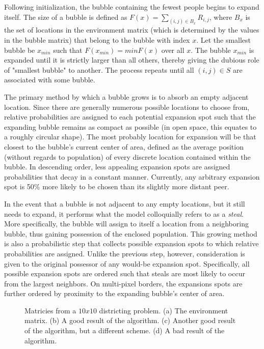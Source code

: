 \documentclass[11pt]{article}				%
\begin{document}
Following initialization, the bubble containing the fewest people begins
to expand itself. The size of a bubble is defined as ${F(x)=\sum_{(i,j)
\in B_x}R_{i,j}}$, where $B_x$ is the set of locations in the environment 
matrix (which is determined by the values in the bubble matrix) that
belong to the bubble with index $x$. Let the smallest bubble be $x_{min}$ 
such that ${F(x_{min})={min} F(x)}$ over all $x$. The bubble $x_{min}$ is 
expanded until it is strictly larger than all others, thereby giving the
dubious role of "smallest bubble" to another. The process repeats until
all $(i,j) \in S$ are associated with some bubble.

The primary method by which a bubble grows is to absorb an empty adjacent 
location. Since there are generally numerous possible locations to choose 
from, relative probabilities are assigned to each potential expansion
spot such that the expanding bubble remains as compact as possible (in
open space, this equates to a roughly circular shape). The most probably
location for expansion will be that closest to the bubble's current
center of area, defined as the average position (without regards to
population) of every discrete location contained within the bubble. In
descending order, less appealing expansion spots are assigned
probabilities that decay in a constant manner. Currently, any arbitrary
expansion spot is 50\% more likely to be chosen than its slightly more
distant peer.

In the event that a bubble is not adjacent to any empty locations, but it 
still needs to expand, it performs what the model colloquially refers to
as a \textit{steal}. More specifically, the bubble will assign to itself
a location from a neighboring bubble, thus gaining possession of the
enclosed population. This growing method is also a probabilistic step
that collects possible expansion spots to which relative probabilities
are assigned. Unlike the previous step, however, consideration is given
to the original possessor of any would-be expansion spot. Specifically,
all possible expansion spots are ordered such that steals are most likely 
to occur from the largest neighbors. On multi-pixel borders, the
expansions spots are further ordered by proximity to the expanding
bubble's center of area.

\begin{figure}
\caption{Matricies from a $10 x 10$ districting problem. (a) The
environment matrix. (b) A good result of the algorithm. (c) Another good
result of the algorithm, but a different scheme. (d) A bad result of the
algorithm.}
\label{fig:10x10}
\end{figure}
\end{document}

